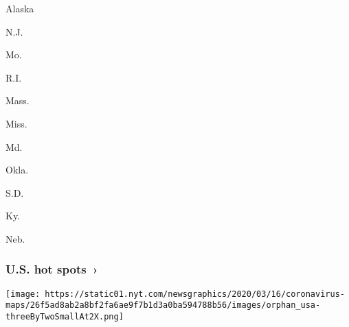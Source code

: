 \href{https://www.nytimes.com/interactive/2020/us/alaska-coronavirus-cases.html}{}

Alaska

\href{https://www.nytimes.com/interactive/2020/us/new-jersey-coronavirus-cases.html}{}

N.J.

\href{https://www.nytimes.com/interactive/2020/us/missouri-coronavirus-cases.html}{}

Mo.

\href{https://www.nytimes.com/interactive/2020/us/rhode-island-coronavirus-cases.html}{}

R.I.

\href{https://www.nytimes.com/interactive/2020/us/massachusetts-coronavirus-cases.html}{}

Mass.

\href{https://www.nytimes.com/interactive/2020/us/mississippi-coronavirus-cases.html}{}

Miss.

\href{https://www.nytimes.com/interactive/2020/us/maryland-coronavirus-cases.html}{}

Md.

\href{https://www.nytimes.com/interactive/2020/us/oklahoma-coronavirus-cases.html}{}

Okla.

\href{https://www.nytimes.com/interactive/2020/us/south-dakota-coronavirus-cases.html}{}

S.D.

\href{https://www.nytimes.com/interactive/2020/us/kentucky-coronavirus-cases.html}{}

Ky.

\href{https://www.nytimes.com/interactive/2020/us/nebraska-coronavirus-cases.html}{}

Neb.

\href{https://www.nytimes.com/interactive/2020/us/coronavirus-us-cases.html}{}

\hypertarget{us-hot-spots-}{%
\subsubsection{U.S. hot spots~›}\label{us-hot-spots-}}

\texttt{[image: https://static01.nyt.com/newsgraphics/2020/03/16/coronavirus-maps/26f5ad8ab2a8bf2fa6ae9f7b1d3a0ba594788b56/images/orphan\_usa-threeByTwoSmallAt2X.png]}

\href{https://www.nytimes.com/interactive/2020/world/coronavirus-maps.html}{}

